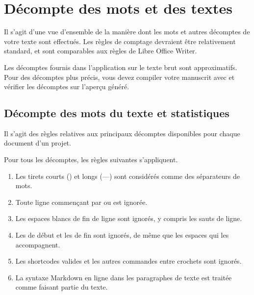 \documentclass[a4paper,11pt,french]{sphinxmanual}
\begin{document}
\sphinxstepscope


\chapter{Décompte des mots et des textes}
\label{\detokenize{more_counting:word-and-text-counts}}\label{\detokenize{more_counting:a-counting}}\label{\detokenize{more_counting::doc}}
\sphinxAtStartPar
Il s’agit d’une vue d’ensemble de la manière dont les mots et autres décomptes de votre texte sont effectués. Les règles de comptage devraient être relativement standard, et sont comparables aux règles de Libre Office Writer.

\sphinxAtStartPar
Les décomptes fournis dans l’application sur le texte brut sont approximatifs. Pour des décomptes plus précis, vous devez compiler votre manuscrit avec  et vérifier les décomptes sur l’aperçu généré.


\section{Décompte des mots du texte et statistiques}
\label{\detokenize{more_counting:text-word-counts-and-stats}}
\sphinxAtStartPar
Il s’agit des règles relatives aux principaux décomptes disponibles pour chaque document d’un projet.

\sphinxAtStartPar
Pour tous les décomptes, les règles suivantes s’appliquent.
\begin{enumerate}
%
\item {} 
\sphinxAtStartPar
Les tirets courts (\sphinxhyphen{}) et longs (—) sont considérés comme des séparateurs de mots.

\item {} 
\sphinxAtStartPar
Toute ligne commençant par \sphinxcode{\sphinxupquote{\%}} ou  est ignorée.

\item {} 
\sphinxAtStartPar
Les espaces blancs de fin de ligne sont ignorés, y compris les sauts de ligne.

\item {} 
\sphinxAtStartPar
Les \sphinxcode{\sphinxupquote{\textgreater{}}} de début et les \sphinxcode{\sphinxupquote{\textless{}}} de fin sont ignorés, de même que les espaces qui les accompagnent.

\item {} 
\sphinxAtStartPar
Les shortcodes valides et les autres commandes entre crochets \sphinxcode{\sphinxupquote{{[}{]}}} sont ignorés.

\item {} 
\sphinxAtStartPar
La syntaxe Markdown en ligne dans les paragraphes de texte est traitée comme faisant partie du texte.

\end{enumerate}
\end{document}

